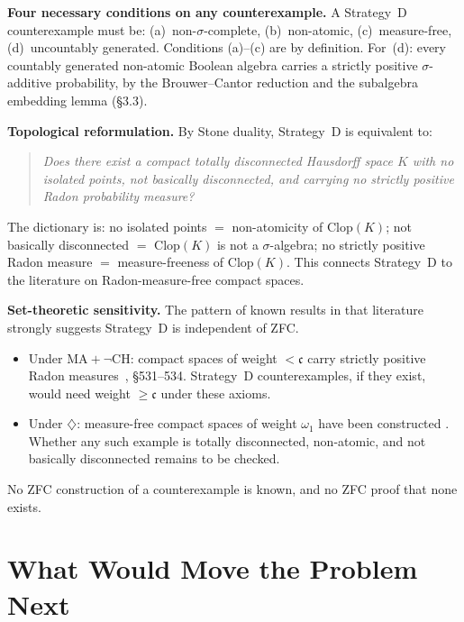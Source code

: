 \documentclass[11pt]{article}
\theoremstyle{definition}
\theoremstyle{remark}
\newcommand{\cc}{\mathfrak{c}}
\begin{document}
\medskip

\noindent\textbf{Four necessary conditions on any counterexample.}
A Strategy~D counterexample must be: (a)~non-$\sigma$-complete, (b)~non-atomic,
(c)~measure-free, (d)~uncountably generated. Conditions (a)--(c) are by definition.
For~(d): every countably generated non-atomic Boolean algebra carries a strictly
positive $\sigma$-additive probability, by the Brouwer--Cantor reduction and the
subalgebra embedding lemma (\S3.3).

\medskip

\noindent\textbf{Topological reformulation.}
By Stone duality, Strategy~D is equivalent to:
\begin{quote}
\textit{Does there exist a compact totally disconnected Hausdorff space $K$ with no
isolated points, not basically disconnected, and carrying no strictly positive Radon
probability measure?}
\end{quote}
The dictionary is: no isolated points $=$ non-atomicity of $\mathrm{Clop}(K)$; not
basically disconnected $=$ $\mathrm{Clop}(K)$ is not a $\sigma$-algebra; no strictly
positive Radon measure $=$ measure-freeness of $\mathrm{Clop}(K)$. This connects
Strategy~D to the literature on Radon-measure-free compact spaces.

\medskip

\noindent\textbf{Set-theoretic sensitivity.}
The pattern of known results in that literature strongly suggests Strategy~D is
independent of ZFC.
\begin{itemize}[nosep]
\item Under $\mathrm{MA}+\neg\mathrm{CH}$: compact spaces of weight $<\cc$ carry
  strictly positive Radon measures~\cite{Fremlin2004}, \S531--534. Strategy~D
  counterexamples, if they exist, would need weight $\geq\cc$ under these axioms.
\item Under $\diamondsuit$: measure-free compact spaces of weight $\omega_1$ have
  been constructed \cite{Kunen1981,Fedorchuk1976}. Whether any such example is
  totally disconnected, non-atomic, and not basically disconnected remains to be
  checked.
\end{itemize}
No ZFC construction of a counterexample is known, and no ZFC proof that none exists.

\section{What Would Move the Problem Next}
\end{document}
